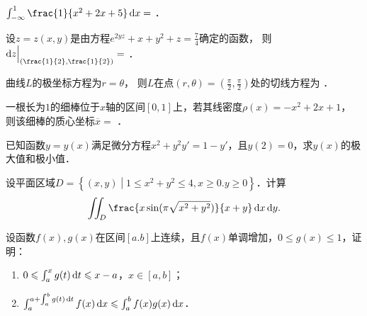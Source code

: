 \documentclass[plain,noanswer,medmath]{../../template/jnuexam}
\begin{document}






\begin{problem}
$\int_{-\infty}^{1} \frac{1}{x^2 + 2x + 5}\dx =$ \fillin{}．
\end{problem}




\begin{problem}
设$z = z(x,y)$是由方程$e^{2yz} + x + y^2 + z = \frac{7}{4}$确定的函数，
则$\dz\Big|_{\left(\frac{1}{2},\frac{1}{2}\right)} =$ \fillin{}．
\end{problem}


\begin{problem}
曲线$L$的极坐标方程为$r = \theta$，
则$L$在点$(r,\theta) = \left(\frac{\pi}{2},\frac{\pi}{2}\right)$处的切线方程为 \fillin{}．
\end{problem}


\begin{problem}
一根长为$1$的细棒位于$x$轴的区间$[0,1]$上，若其线密度$\rho (x) = - x^2 + 2x + 1$，
则该细棒的质心坐标$\overline{x} =$ \fillin{}．
\end{problem}








\begin{problem}[points=10]
已知函数$y = y(x)$满足微分方程$x^2 + y^2 y' = 1 - y'$，且$y(2) = 0$，求$y(x)$的极大值和极小值．
\end{problem}


\begin{problem}[points=10]
设平面区域$D = \left\{(x,y)\middle|1 \le x^2 + y^2 \le 4,x \ge 0.y \ge 0 \right\}$．计算
$$\iint_D \frac{x\sin(\pi \sqrt{x^2 + y^2})}{x + y}\dx\dy.$$
\end{problem}




\begin{problem}[points=10]
设函数$f(x),g(x)$在区间$[a.b]$上连续，且$f(x)$单调增加，$0 \le g(x) \le 1$，证明：
\begin{enumerate}
\item $0 \leqslant \int_a^x g(t)\mathop{}\!\mathrm{d} t \leqslant x - a$，$x \in [a,b]$；
\item $\int_a^{a + \int_a^b g(t)\mathop{}\!\mathrm{d} t} f(x)\mathop{}\!\mathrm{d} x \leqslant \int_a^b f(x)g(x)\mathop{}\!\mathrm{d} x$．
\end{enumerate}
\end{problem}
\end{document}
